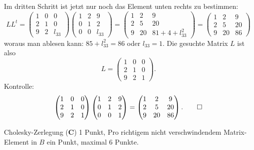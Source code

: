\begin{loesung}
Im dritten Schritt ist jetzt nur noch das Element unten rechts zu bestimmen:
\[
LL^t=
\begin{pmatrix}
1&0&     0\\
2&1&     0\\
9&2&l_{33}
\end{pmatrix}
\begin{pmatrix}
1&2&     9\\
0&1&     2\\
0&0&l_{33}
\end{pmatrix}
=
\begin{pmatrix}
1& 2& 9\\
2& 5&20\\
9&20&81+4+l_{33}^2
\end{pmatrix}
=
\begin{pmatrix}
1& 2& 9\\
2& 5&20\\
9&20&86
\end{pmatrix}
\]
woraus man ablesen kann: $85+l_{33}^2=86$ oder $l_{33}=1$. Die gesuchte
Matrix $L$ ist also
\[
L=
\begin{pmatrix}
1&0&0\\
2&1&0\\
9&2&1
\end{pmatrix}.
\]
Kontrolle:
\[
\begin{pmatrix}
1&0&0\\
2&1&0\\
9&2&1
\end{pmatrix}
\begin{pmatrix}
1&2&9\\
0&1&2\\
0&0&1
\end{pmatrix}
=
\begin{pmatrix}
1& 2& 9\\
2& 5&20\\
9&20&86
\end{pmatrix}.
\qedhere
\]
\end{loesung}

\begin{bewertung}
Cholesky-Zerlegung ({\bf C}) 1 Punkt,
Pro richtigem nicht verschwindendem Matrix-Element in $B$ ein Punkt,
maximal 6 Punkte.
\end{bewertung}


